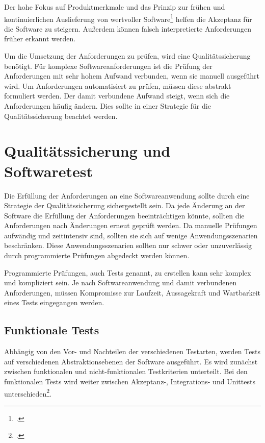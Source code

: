Der hohe Fokus auf Produktmerkmale und das Prinzip zur frühen und kontinuierlichen Auslieferung von wertvoller Software\footcite[vgl.][]{agile-manifest-principles} helfen die Akzeptanz für die Software zu steigern. Außerdem können falsch interpretierte Anforderungen früher erkannt werden. 

Um die Umsetzung der Anforderungen zu prüfen, wird eine Qualitätssicherung benötigt. Für komplexe Softwareanforderungen ist die Prüfung der Anforderungen mit sehr hohem Aufwand verbunden, wenn sie manuell ausgeführt wird. Um Anforderungen automatisiert zu prüfen, müssen diese abstrakt formuliert werden. Der damit verbundene Aufwand steigt, wenn sich die Anforderungen häufig ändern. Dies sollte in einer Strategie für die Qualitätssicherung beachtet werden. 

\section{Qualitätssicherung und Softwaretest}

Die Erfüllung der Anforderungen an eine Softwareanwendung sollte durch eine Strategie der Qualitätssicherung sichergestellt sein. Da jede Änderung an der Software die Erfüllung der Anforderungen beeinträchtigen könnte, sollten die Anforderungen nach Änderungen erneut geprüft werden. Da manuelle Prüfungen aufwändig und zeitintensiv sind, sollten sie sich auf wenige Anwendungsszenarien beschränken. Diese Anwendungsszenarien sollten nur schwer oder unzuverlässig durch programmierte Prüfungen abgedeckt werden können.

Programmierte Prüfungen, auch Tests genannt, zu erstellen kann sehr komplex und kompliziert sein. Je nach Softwareanwendung und damit verbundenen Anforderungen, müssen Kompromisse zur Laufzeit, Aussagekraft und Wartbarkeit eines Tests eingegangen werden.

\subsection{Funktionale Tests}

Abhängig von den Vor- und Nachteilen der verschiedenen Testarten, werden Tests auf verschiedenen Abstraktionsebenen der Software ausgeführt. Es wird zunächst zwischen funktionalen und nicht-funktionalen Testkriterien unterteilt.
Bei den funktionalen Tests wird weiter zwischen Akzeptanz-, Integrations- und Unittests unterschieden\footcite[S.159][]{software-quality2008}. 


